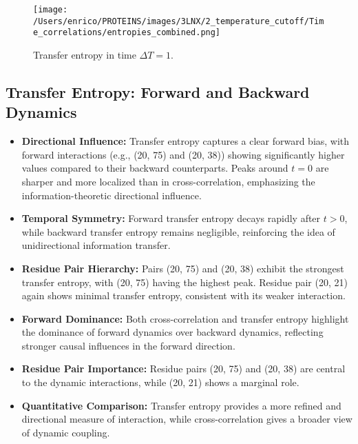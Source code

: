 \documentclass[English, Lau, oneside]{sapthesis}
\begin{document}
\newpage

\begin{figure}[h!]
    \centering
    \texttt{[image: /Users/enrico/PROTEINS/images/3LNX/2\_temperature\_cutoff/Time\_correlations/entropies\_combined.png]}
    \caption{Transfer entropy in time $\Delta T = 1$.}
\end{figure}

\subsection{Transfer Entropy: Forward and Backward Dynamics}
\begin{itemize}
    \item \textbf{Directional Influence:} Transfer entropy captures a clear forward bias, with forward interactions (e.g., (20, 75) and (20, 38)) showing significantly higher values compared to their backward counterparts. Peaks around \(t = 0\) are sharper and more localized than in cross-correlation, emphasizing the information-theoretic directional influence.
    \item \textbf{Temporal Symmetry:} Forward transfer entropy decays rapidly after \(t > 0\), while backward transfer entropy remains negligible, reinforcing the idea of unidirectional information transfer.
    \item \textbf{Residue Pair Hierarchy:} Pairs (20, 75) and (20, 38) exhibit the strongest transfer entropy, with (20, 75) having the highest peak. Residue pair (20, 21) again shows minimal transfer entropy, consistent with its weaker interaction.
\end{itemize}






\begin{itemize}
    \item \textbf{Forward Dominance:} Both cross-correlation and transfer entropy highlight the dominance of forward dynamics over backward dynamics, reflecting stronger causal influences in the forward direction.
    \item \textbf{Residue Pair Importance:} Residue pairs (20, 75) and (20, 38) are central to the dynamic interactions, while (20, 21) shows a marginal role.
    \item \textbf{Quantitative Comparison:} Transfer entropy provides a more refined and directional measure of interaction, while cross-correlation gives a broader view of dynamic coupling.
\end{itemize}
\end{document}

